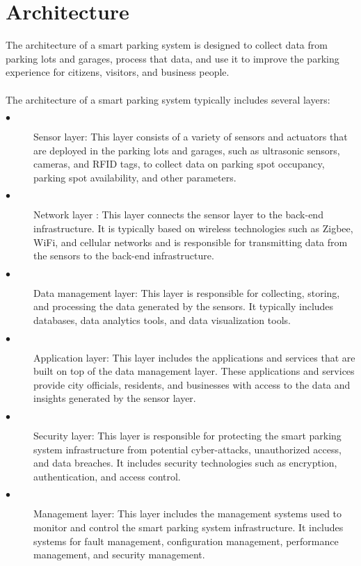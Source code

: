 \documentclass[12pt]{article}
\begin{document}
    
\section{Architecture}
	The architecture of a smart parking system is designed to collect data from parking lots and garages, process that data, and use it to improve the parking experience for citizens, visitors, and business people.\\
    \\
    The architecture of a smart parking system typically includes several layers: 

\begin{description}
  \item[$\bullet$] Sensor layer: This layer consists of a variety of sensors and actuators that are deployed in the parking lots and garages, such as ultrasonic sensors, cameras, and RFID tags, to collect data on parking spot occupancy, parking spot availability, and other parameters.
  \item[$\bullet$] Network layer : This layer connects the sensor layer to the back-end infrastructure. It is typically based on wireless technologies such as Zigbee, WiFi, and cellular networks and is responsible for transmitting data from the sensors to the back-end infrastructure.
  \item[$\bullet$] Data management layer: This layer is responsible for collecting, storing, and processing the data generated by the sensors. It typically includes databases, data analytics tools, and data visualization tools.
  \item[$\bullet$] Application layer: This layer includes the applications and services that are built on top of the data management layer. These applications and services provide city officials, residents, and businesses with access to the data and insights generated by the sensor layer.
  \item[$\bullet$] Security layer: This layer is responsible for protecting the smart parking system infrastructure from potential cyber-attacks, unauthorized access, and data breaches. It includes security technologies such as encryption, authentication, and access control.
  \item[$\bullet$] Management layer: This layer includes the management systems used to monitor and control the smart parking system infrastructure. It includes systems for fault management, configuration management, performance management, and security management.

\end{description}
\end{document}

